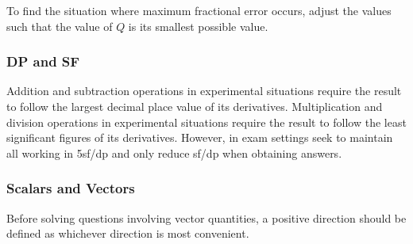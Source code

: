 \documentclass[../main]{subfiles}
\begin{document}
	To find the situation where maximum fractional error occurs, adjust the values such that the value of \(Q\) is its smallest possible value. \\

	\subsubsection{DP and SF}

	Addition and subtraction operations in experimental situations require the result to follow the largest decimal place value of its derivatives. Multiplication and division operations in experimental situations require the result to follow the least significant figures of its derivatives. However, in exam settings seek to maintain all working in 5sf/dp and only reduce sf/dp when obtaining answers.

	\subsubsection{Scalars and Vectors}



	Before solving questions involving vector quantities, a positive direction should be defined as whichever direction is most convenient.
\end{document}
